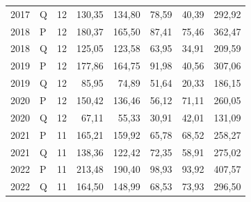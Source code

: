 \begin{longtable}{llrrrrrr}
2017 & Q & 12 & 130,35 & 134,80 & 78,59 & 40,39 & 292,92 \\
2018 & P & 12 & 180,37 & 165,50 & 87,41 & 75,46 & 362,47 \\
2018 & Q & 12 & 125,05 & 123,58 & 63,95 & 34,91 & 209,59 \\
2019 & P & 12 & 177,86 & 164,75 & 91,98 & 40,56 & 307,06 \\
2019 & Q & 12 & 85,95 & 74,89 & 51,64 & 20,33 & 186,15 \\
2020 & P & 12 & 150,42 & 136,46 & 56,12 & 71,11 & 260,05 \\
2020 & Q & 12 & 67,11 & 55,33 & 30,91 & 42,01 & 131,09 \\
2021 & P & 11 & 165,21 & 159,92 & 65,78 & 68,52 & 258,27 \\
2021 & Q & 11 & 138,36 & 122,42 & 72,35 & 58,91 & 275,02 \\
2022 & P & 11 & 213,48 & 190,40 & 98,93 & 93,92 & 407,57 \\
2022 & Q & 11 & 164,50 & 148,99 & 68,53 & 73,93 & 296,50 \\
\end{longtable}\endgroup
